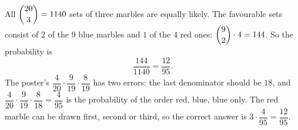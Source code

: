 All $\dbinom{20}3=1140$ sets of three marbles are equally likely. The favourable sets consist of $2$ of the $9$ blue marbles and $1$ of the $4$ red ones: $\dbinom92\cdot4=144$. So the probability is
\[
\dfrac{144}{1140}=\boxed{\dfrac{12}{95}}.
\]
The poster's $\dfrac{4}{20}\cdot\dfrac{9}{19}\cdot\dfrac{8}{19}$ has two errors: the last denominator should be $18$, and $\dfrac{4}{20}\cdot\dfrac{9}{19}\cdot\dfrac{8}{18}=\dfrac{4}{95}$ is the probability of the order red, blue, blue only. The red marble can be drawn first, second or third, so the correct answer is $3\cdot\dfrac{4}{95}=\dfrac{12}{95}$.
